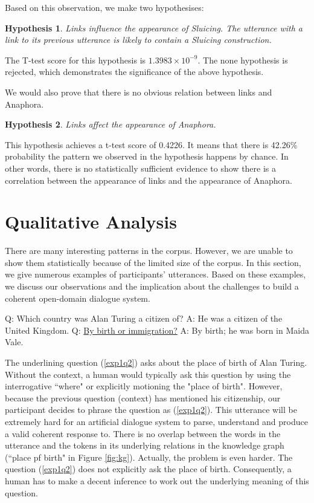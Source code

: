 \documentclass[bsc,frontabs,twoside,singlespacing,parskip,deptreport]{infthesis}     %
\newtheorem{hypo}{Hypothesis}[chapter]
\begin{document}
Based on this observation, we make two hypothesises:

\begin{hypo}
Links influence the appearance of Sluicing. The utterance with a link to its previous utterance is likely to contain a Sluicing construction.
\end{hypo}

The T-test score for this hypothesis is $1.3983 \times 10^{-9}$. The none hypothesis is rejected, which demonstrates the significance of the above hypothesis.

We would also prove that there is no obvious relation between links and Anaphora.

\begin{hypo}
Links affect the appearance of Anaphora.
\end{hypo}

This hypothesis achieves a t-test score of 0.4226. It means that there is 42.26\% probability the pattern we observed in the hypothesis happens by chance. In other words, there is no statistically sufficient evidence to show there is a correlation between the appearance of links and the appearance of Anaphora.

\section{Qualitative Analysis}

There are many interesting patterns in the corpus. However, we are unable to show them statistically because of the limited size of the corpus. In this section, we give numerous examples of participants' utterances. Based on these examples, we discuss our observations and the implication about the challenges to build a coherent open-domain dialogue system.

\begin{exe}
	\ex
		\begin{xlist}
			\ex \label{exp1q1} Q: Which country was Alan Turing a citizen of?
			\ex \label{exp1a1} A: He was a citizen of the United Kingdom.
			\ex \label{exp1q2} Q: \underline{By birth or immigration?}
			\ex \label{exp1a2} A: By birth; he was born in Maida Vale.
	\end{xlist}
\end{exe}

The underlining question (\ref{exp1q2}) asks about the place of birth of Alan Turing. Without the context, a human would typically ask this question by using the interrogative ``where" or explicitly motioning the "place of birth". However, because the previous question (context) has mentioned his citizenship, our participant decides to phrase the question as (\ref{exp1q2}). This utterance will be extremely hard for an artificial dialogue system to parse, understand and produce a valid coherent response to. There is no overlap between the words in the utterance and the tokens in its underlying relations in the knowledge graph (``place pf birth" in Figure \ref{fig:kg}). Actually, the problem is even harder. The question (\ref{exp1q2}) does not explicitly ask the place of birth. Consequently, a human has to make a decent inference to work out the underlying meaning of this question.
\end{document}
